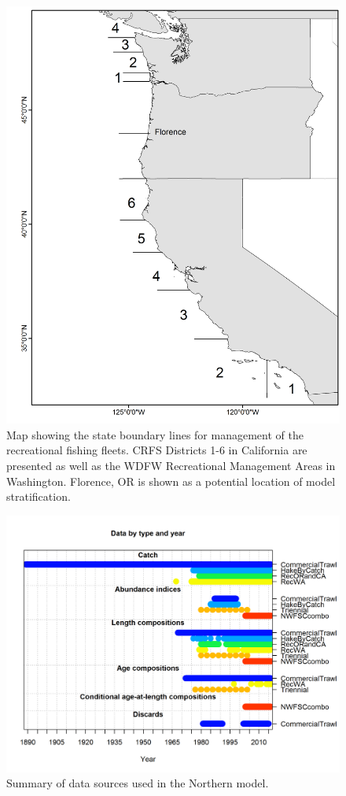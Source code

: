 \documentclass[12pt,]{article}
\begin{document}
\begin{figure}[htbp]
\centering
\includegraphics{Figures/boundary_map.png}
\caption{Map showing the state boundary lines for management of the
recreational fishing fleets. CRFS Districts 1-6 in California are
presented as well as the WDFW Recreational Management Areas in
Washington. Florence, OR is shown as a potential location of model
stratification. \label{fig:boundary_map}}
\end{figure}

\begin{figure}[htbp]
\centering
\includegraphics{r4ss/plots_mod1/data_plot.png}
\caption{Summary of data sources used in the Northern model.
\label{fig:data_plot}}
\end{figure}
\end{document}
